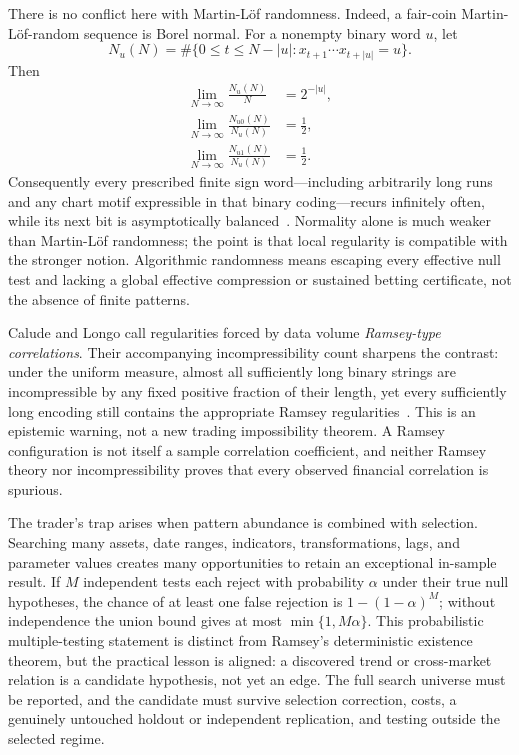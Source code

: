 \documentclass[aps,pra,reprint,superscriptaddress,amsmath,amssymb,floatfix]{revtex4-2}
\theoremstyle{plain}
\theoremstyle{definition}
\theoremstyle{remark}
\begin{document}
There is no conflict here with Martin-L\"of randomness. Indeed, a fair-coin
Martin-L\"of-random sequence is Borel normal. For a nonempty binary word \(u\),
let
\[
 N_u(N)=\#\{0\leq t\leq N-|u|:
 x_{t+1}\cdots x_{t+|u|}=u\}.
\]
Then
\begin{equation}
 \begin{aligned}
  \lim_{N\to\infty}\frac{N_u(N)}{N}
    &=2^{-|u|},\\
  \lim_{N\to\infty}\frac{N_{u0}(N)}{N_u(N)}
    &=\frac12,\\
  \lim_{N\to\infty}\frac{N_{u1}(N)}{N_u(N)}
    &=\frac12 .
 \end{aligned}
 \label{eq:randomnormality}
\end{equation}
Consequently every prescribed finite sign word---including arbitrarily long
runs and any chart motif expressible in that binary coding---recurs infinitely
often, while its next bit is asymptotically
balanced~\cite{calude:02,Nies2009}. Normality alone is much weaker than
Martin-L\"of randomness; the point is that local regularity is compatible with
the stronger notion. Algorithmic randomness means escaping every effective
null test and lacking a global effective compression or sustained betting
certificate, not the absence of finite patterns.

Calude and Longo call regularities forced by data volume
\emph{Ramsey-type correlations}. Their accompanying incompressibility count
sharpens the contrast: under the uniform measure, almost all sufficiently long
binary strings are incompressible by any fixed positive fraction of their
length, yet every sufficiently long encoding still contains the appropriate
Ramsey regularities~\cite{Calude2016}. This is an epistemic warning, not a new
trading impossibility theorem. A Ramsey configuration is not itself a sample
correlation coefficient, and neither Ramsey theory nor incompressibility proves
that every observed financial correlation is spurious.

The trader's trap arises when pattern abundance is combined with selection.
Searching many assets, date ranges, indicators, transformations, lags, and
parameter values creates many opportunities to retain an exceptional in-sample
result. If \(M\) independent tests each reject with probability \(\alpha\)
under their true null hypotheses, the chance of at least one false rejection
is \(1-(1-\alpha)^M\); without independence the union bound gives at most
\(\min\{1,M\alpha\}\). This probabilistic multiple-testing statement is
distinct from Ramsey's deterministic existence theorem, but the practical
lesson is aligned: a discovered trend or cross-market relation is a candidate
hypothesis, not yet an edge. The full search universe must be reported, and the
candidate must survive selection correction, costs, a genuinely untouched
holdout or independent replication, and testing outside the selected regime.
\end{document}
